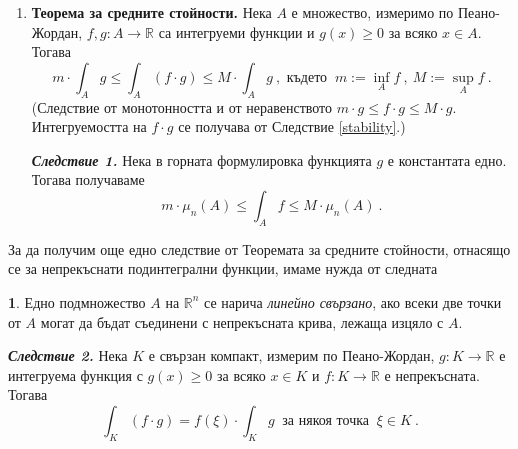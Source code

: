 \documentclass[11pt]{article}
\numberwithin{equation}{section}
\numberwithin{figure}{section}
\numberwithin{table}{section}
\theoremstyle{plain}
\theoremstyle{definition}
\newtheorem{defn}[thm]{\protect\definitionname}
\theoremstyle{remark}
\theoremstyle{definition}
\theoremstyle{remark}
\theoremstyle{plain}
\theoremstyle{definition}
\theoremstyle{definition}
\theoremstyle{plain}
\theoremstyle{plain}
\theoremstyle{plain}
\theoremstyle{definition}
\theoremstyle{plain}
\providecommand{\definitionname}{Дефиниция}
\newcommand*{\R}{\mathbb{R}}
\begin{document}
\begin{enumerate}
    (Директно от свойството монотонност на интеграла върху паралелотоп и от факта, че $f^*(x)\ge 0$ за всяко $x\in \Delta$, където $\Delta\supset A$.)

    \textbf{\textit{Следствие 1.}} Нека $A$ е множество, измеримо по Пеано-Жордан, $f, g: A \longrightarrow\R$ са интегруеми функции и $f(x)\ge g(x)$ за всяко $x\in A$. Тогава $\int_A f \ge \int_A g$.

    (Наистина, $\int_A f - \int_A g=\int_A (f -g) \ge 0$ от линейността и монотонността.)

\textbf{\textit{Следствие 2.}} Ако $f:A\longrightarrow\R$ е интегруема в измеримото множество $A$, то $|f|$ е интегруема в  $A$ и $|\int_A f|\le \int_A |f|$.

(Интегруемостта е директна от критерия \ref{criterion_on_sets}, а неравенството от $-|f|\le f\le |f|$ и предишното следствие.)

\item \textbf{Теорема за средните стойности.} Нека $A$ е множество, измеримо по Пеано-Жордан, $f, g: A \longrightarrow\R$ са интегруеми функции и $g(x)\ge 0$ за всяко $x\in A$. Тогава
    $$m\cdot \int_A g \le \int_A (f\cdot g) \le M\cdot \int_A g \ , \mbox{ където } \ m:= \inf_A f \ , \ M:= \sup_A f \ .$$
(Следствие от монотонността и от неравенството $m\cdot g\le f\cdot g\le M\cdot g$. Интегруемостта на $f\cdot g$ се получава от Следствие \ref{stability}.)

\textbf{\textit{Следствие 1.}} Нека в горната формулировка функцията $g$ е константата едно. Тогава получаваме
  $$m\cdot \mu_n(A) \le \int_A f \le M\cdot \mu_n(A) \ .$$
\end{enumerate}

За да получим още едно следствие от Теоремата за средните стойности, отнасящо се за непрекъснати подинтегрални функции, имаме нужда от следната
\begin{defn}
Едно подмножество $A$ на $\R^n$ се нарича \textit{линейно свързано}, ако всеки две точки от $A$ могат да бъдат съединени с непрекъсната крива, лежаща изцяло с $A$.
\end{defn}

\textbf{\textit{Следствие 2.}} Нека $K$ е свързан компакт, измерим по Пеано-Жордан, $g: K \longrightarrow\R$ е интегруема функция с $g(x)\ge 0$ за всяко $x\in K$ и $f: K \longrightarrow\R$ е непрекъсната. Тогава
    $$\int_K (f\cdot g) = f(\xi)\cdot \int_K g \  \mbox{ за някоя точка } \ \xi\in K \ .$$
    
\end{document}

